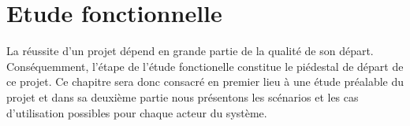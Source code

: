 \chapter{Etude fonctionnelle}
La réussite d’un projet dépend en grande partie de la qualité de son départ. Conséquemment, l’étape de l'étude fonctionelle constitue le piédestal de départ de ce projet. Ce chapitre sera donc consacré en premier lieu à une étude préalable du projet et dans sa deuxième partie nous présentons les scénarios et les cas d’utilisation possibles pour chaque acteur du système.




